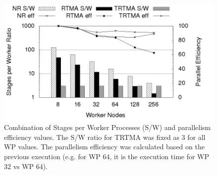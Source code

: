 \begin{figure}[h]
\begin{center}
    \includegraphics[width=1\textwidth]{gnuplot/eff.png}
	\caption{Combination of Stages per Worker Processes (S/W) and parallelism efficiency values. The S/W ratio for TRTMA was fixed as 3 for all WP values. The parallelism efficiency was calculated based on the previous execution (e.g. for WP 64, it is the execution time for WP 32 vs WP 64).}
	\label{fig:srs2}
\end{center}
\vspace*{-3ex}
\end{figure}


